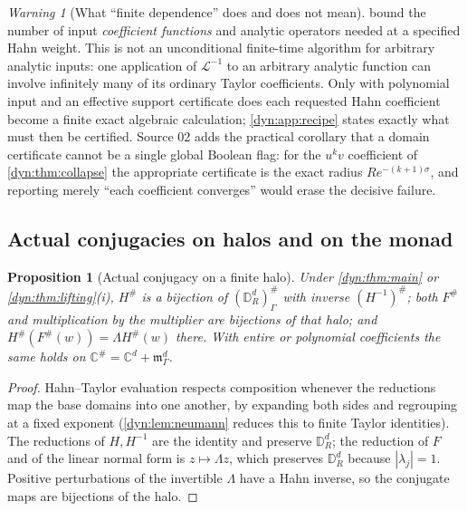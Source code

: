 \documentclass[11pt,letterpaper]{article}
\newtheorem{proposition}[proposition]{Proposition}
\theoremstyle{definition}
\theoremstyle{remark}
\newtheorem{warning}[warning]{Warning}
\newcommand{\C}{\mathbb C}
\newcommand{\m}{\mathfrak m}
\newcommand{\Li}{\mathcal L}
\numberwithin{equation}{section}
\begin{document}
\begin{warning}[What ``finite dependence'' does and does not mean]
\label{dyn:warn:finitedep}
 bound
the number of input \emph{coefficient functions} and analytic operators
needed at a specified Hahn weight. This is not an unconditional finite-time
algorithm for arbitrary analytic inputs: one application of $\Li^{-1}$ to
an arbitrary analytic function can involve infinitely many of its ordinary
Taylor coefficients. Only with polynomial input and an effective support
certificate does each requested Hahn coefficient become a finite exact
algebraic calculation; \cref{dyn:app:recipe} states exactly what must then
be certified. Source 02 adds the practical corollary that a domain
certificate cannot be a single global Boolean flag: for the $u^{k}v$
coefficient of \cref{dyn:thm:collapse} the appropriate certificate is the
exact radius $Re^{-(k+1)\sigma}$, and reporting merely ``each coefficient
converges'' would erase the decisive failure.
\end{warning}

\subsection{Actual conjugacies on halos and on the monad}

\begin{proposition}[Actual conjugacy on a finite halo]\label{dyn:prop:halo}
Under \cref{dyn:thm:main} or \cref{dyn:thm:lifting}(i), $H^{\#}$ is a
bijection of $(\mathbb D_R^{d})^{\#}_\Gamma$ with inverse
$(H^{-1})^{\#}$; both $F^{\#}$ and multiplication by the multiplier are
bijections of that halo; and
$H^{\#}(F^{\#}(w))=\Lambda H^{\#}(w)$ there. With entire or polynomial
coefficients the same holds on $\C^{\#}=\C^{d}+\m_\Gamma^{d}$.
\end{proposition}
\begin{proof}
Hahn--Taylor evaluation respects composition whenever the reductions map
the base domains into one another, by expanding both sides and regrouping
at a fixed exponent (\cref{dyn:lem:neumann} reduces this to finite Taylor
identities). The reductions of $H,H^{-1}$ are the identity and preserve
$\mathbb D_R^{d}$; the reduction of $F$ and of the linear normal form is
$z\mapsto\Lambda z$, which preserves $\mathbb D_R^{d}$ because
$|\lambda_j|=1$. Positive perturbations of the invertible $\Lambda$ have a
Hahn inverse, so the conjugate maps are bijections of the halo.
\end{proof}
\end{document}
